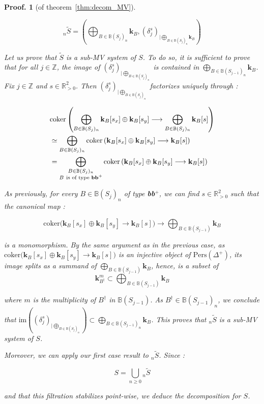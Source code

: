 \documentclass[a4paper, english, 11pt]{article}
\newcommand{\kk}[0]{\textbf{k}}
\newcommand{\0}{\vec{0}}
\newcommand{\R}[0]{\mathbb{R}}
\newcommand{\Z}[0]{\mathbb{Z}}
\newcommand{\Pers}[0]{\text{Pers}}
\newtheorem*{pf}{Proof.} }
\begin{document}
\begin{pf}[of theorem~\ref{thm:decom_MV}]
\begin{itemize}
$${}_n\tilde{S} = \left (\bigoplus_{B\in \mathbb{B}(S_j)_n } \kk_{B}, (\delta_j^s)_{|\bigoplus_{B\in \mathbb{B}(S_j)_n } \kk_{B}} \right )  $$

 Let us prove that $\tilde{S}$ is a sub-MV system of $S$. To do so, it is sufficient to prove that for all $j\in  \Z$, the image of $(\delta_j^s)_{|\bigoplus_{B\in \mathbb{B}(S_j)_n}}$ is contained in $\bigoplus_{B\in \mathbb{B}(S_{j-1})_n } \kk_{B}$. Fix $j\in \Z$ and $s\in \R^2_{>0}$. Then $(\delta_j^s)_{|\bigoplus_{B\in \mathbb{B}(S_j)_n}}$ factorizes uniquely through : 
 
 \begin{align*}
     & \text{coker} \left ( \bigoplus_{B\in \mathbb{B}(S_j)_n } \kk_{B}[s_x] \oplus  \kk_{B} [s_y] \longrightarrow \bigoplus_{B\in \mathbb{B}(S_j)_n } \kk_{B}[s]  \right )   \\ 
     &\simeq \bigoplus_{B\in \mathbb{B}(S_j)_n }  \text{coker} \left ( \kk_{B}[s_x] \oplus  \kk_{B} [s_y] \longrightarrow  \kk_{B}[s] \right ) \\
     &=  \bigoplus_{ \substack{B\in \mathbb{B}(S_j)_n\\ B ~\text{is of type \textbf{bb$^+$}} } } \text{coker} \left ( \kk_{B}[s_x] \oplus  \kk_{B} [s_y] \longrightarrow  \kk_{B}[s] \right ) 
 \end{align*} 
 
As previously, for every $B\in \mathbb{B}(S_j)_n$ of type \textbf{bb$^+$}, we can find $s\in \R^2_{>0}$ such that the canonical map : 

$$ \text{coker} \big ( \kk_{B}[s_x] \oplus  \kk_{B} [s_y] \longrightarrow  \kk_{B}[s] \big  )  \longrightarrow \bigoplus_{B\in \mathbb{B}(S_{j-1}) } \kk_{B} $$

is a monomorphism. By the same argument as in the previous case, as  $ \text{coker} \big ( \kk_{B}[s_x] \oplus  \kk_{B} [s_y] \longrightarrow  \kk_{B}[s] \big  ) $ is an injective object of $\Pers(\Delta^+)$, its image splits as a summand of $\bigoplus_{B\in \mathbb{B}(S_{j-1}) } \kk_{B}$, hence, is a subset of 
$$  \kk_{B^\dag}^m\subset \bigoplus_{B\in \mathbb{B}(S_{j-1}) } \kk_B $$

where $m$ is the multiplicity of $B^\dag$ in $\mathbb{B}(S_{j-1}) $. As $B^\dag\in \mathbb{B}(S_{j-1})_n$, we conclude that $\text{im} ((\delta_j^s)_{|\bigoplus_{B\in \mathbb{B}(S_j)_n}}) \subset \bigoplus_{B\in \mathbb{B}(S_{j-1})_n } \kk_{B} $. This proves that ${}_n\tilde{S}$ is a sub-MV system of $S$.

Moreover, we can apply our first case result to ${}_n\tilde{S}$. Since : 

$$S = \bigcup_{n\geq 0} {}_n\tilde{S} $$

and that this filtration stabilizes point-wise, we deduce the decomposition for $S$.


\end{itemize}

\end{pf}
\end{document}
